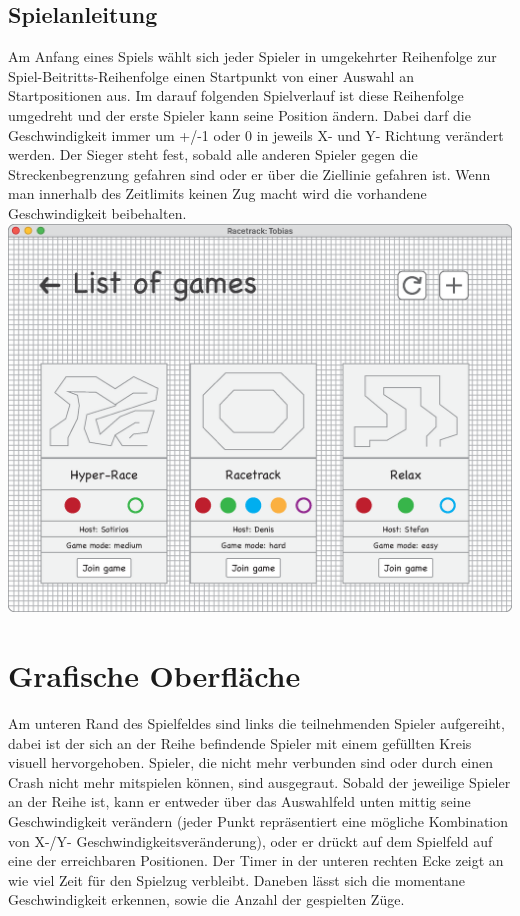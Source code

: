 \documentclass[a0, portrait, english, ngerman]{a0poster}
\begin{document}
\begin{multicols}{3}
\subsection{Spielanleitung}

Am Anfang eines Spiels wählt sich jeder Spieler 
in umgekehrter Reihenfolge zur Spiel-Beitritts-Reihenfolge einen Startpunkt von einer Auswahl an Startpositionen aus. Im darauf folgenden Spielverlauf ist diese Reihenfolge umgedreht und der erste Spieler kann seine Position ändern. Dabei darf die Geschwindigkeit immer um +/-1 oder 0 in jeweils X- und Y- Richtung verändert werden. Der Sieger steht fest, sobald alle anderen Spieler gegen die Streckenbegrenzung gefahren sind oder er über die Ziellinie gefahren ist. Wenn man innerhalb des Zeitlimits keinen Zug macht wird die vorhandene Geschwindigkeit beibehalten.\\

\centering \includegraphics[scale=0.85]{images/ListOfGames.eps} \\

\section{Grafische Oberfläche}

Am unteren Rand des Spielfeldes sind links die teilnehmenden Spieler aufgereiht, dabei ist der sich an der Reihe befindende Spieler mit einem gefüllten Kreis visuell hervorgehoben. Spieler, die nicht mehr verbunden sind oder durch einen Crash nicht mehr mitspielen können, sind ausgegraut. Sobald der jeweilige Spieler an der Reihe ist, kann er entweder über das Auswahlfeld unten mittig seine Geschwindigkeit verändern (jeder Punkt repräsentiert eine mögliche Kombination von X-/Y- Geschwindigkeitsveränderung), oder er drückt auf dem Spielfeld auf eine der erreichbaren Positionen. Der Timer in der unteren rechten Ecke zeigt an wie viel Zeit für den Spielzug verbleibt. Daneben lässt sich die momentane Geschwindigkeit erkennen, sowie die Anzahl der gespielten Züge.\\


\end{multicols}
\end{document}

